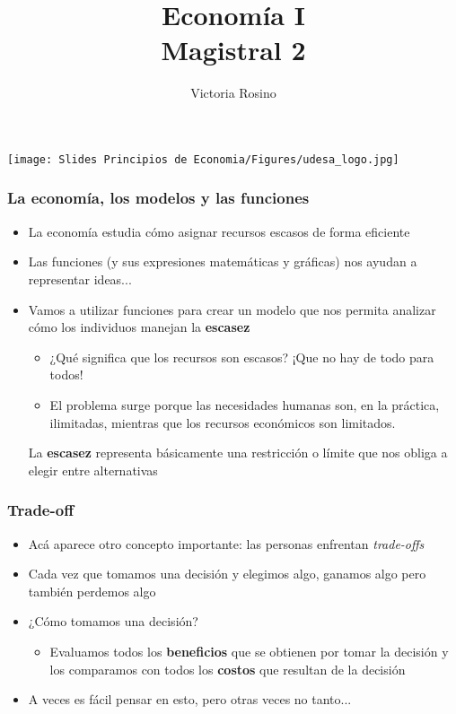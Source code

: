 \documentclass{beamer}
\title[Economía I]{Economía I \vspace{4mm}
\\ Magistral 2}
\date{}
\author[Victoria Rosino]{Victoria Rosino}
\institute[]{Universidad de San Andrés}
\begin{document}
\begin{frame}
\vspace{0.4cm}
\titlepage
\centering
\vspace{-0.5cm}
\texttt{[image: Slides Principios de Economia/Figures/udesa\_logo.jpg]} 
\end{frame}


\begin{frame}
\frametitle{La economía, los modelos y las funciones}
\begin{itemize}
    \item La economía estudia cómo asignar recursos escasos de forma eficiente \vspace{2mm}
    \item Las funciones (y sus expresiones matemáticas y gráficas) nos ayudan a representar ideas... \vspace{2mm}
    \item Vamos a utilizar funciones para crear un modelo que nos permita analizar cómo los individuos manejan la \textbf{escasez} 
    \begin{itemize}
        \item ¿Qué significa que los recursos son escasos? ¡Que no hay de todo para todos! 
        \item El problema surge porque las necesidades humanas son, en la práctica, ilimitadas, mientras que los recursos económicos son limitados. 
    \end{itemize}
    \begin{boxB}
    \centering
    La \textbf{escasez} representa básicamente una restricción o límite que nos obliga a elegir entre alternativas
    \end{boxB}
\end{itemize} 
\end{frame}

\begin{frame}
\frametitle{Trade-off}
\begin{itemize}
    \item Acá aparece otro concepto importante: las personas enfrentan \textit{trade-offs} \vspace{2mm}
    \item Cada vez que tomamos una decisión y elegimos algo, ganamos algo pero también perdemos algo \vspace{2mm}
    \item ¿Cómo tomamos una decisión? 
    \begin{itemize}
        \item Evaluamos todos los \textbf{beneficios} que se obtienen por tomar la decisión y los comparamos con todos los \textbf{costos} que resultan de la decisión
        \vspace{1mm}
    \end{itemize}
    \item A veces es fácil pensar en esto, pero otras veces no tanto...
\end{itemize} 
\end{frame}
\end{document}
